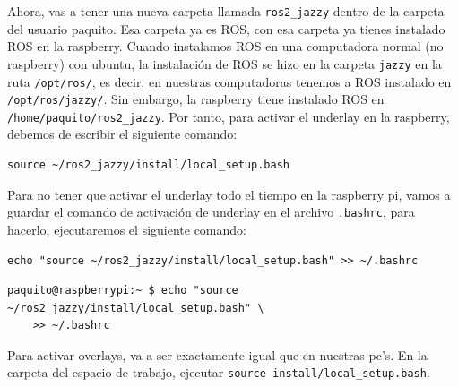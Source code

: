Ahora, vas a tener una nueva carpeta llamada \texttt{ros2\_jazzy} dentro de la carpeta del usuario paquito. Esa carpeta ya es ROS, con esa carpeta ya tienes instalado ROS en la raspberry. Cuando instalamos ROS en una computadora normal (no raspberry) con ubuntu, la instalación de ROS se hizo en la carpeta \texttt{jazzy} en la ruta \texttt{/opt/ros/}, es decir, en nuestras computadoras tenemos a ROS instalado en \texttt{/opt/ros/jazzy/}. Sin embargo, la raspberry tiene instalado ROS en \texttt{/home/paquito/ros2\_jazzy}. Por tanto, para activar el underlay en la raspberry, debemos de escribir el siguiente comando:

\begin{center}
    \begin{Verbatim}[gobble=4]
    source ~/ros2_jazzy/install/local_setup.bash    
    \end{Verbatim}
\end{center}

Para no tener que activar el underlay todo el tiempo en la raspberry pi, vamos a guardar el comando de activación de underlay en el archivo \texttt{.bashrc}, para hacerlo, ejecutaremos el siguiente comando:%

\begin{center}
    \begin{Verbatim}[gobble=4]
    echo "source ~/ros2_jazzy/install/local_setup.bash" >> ~/.bashrc    
    \end{Verbatim}
\end{center}

\begin{center}
    \begin{Verbatim}[gobble=4]
    paquito@raspberrypi:~ $ echo "source ~/ros2_jazzy/install/local_setup.bash" \
    >> ~/.bashrc
    \end{Verbatim}
\end{center}

Para activar overlays, va a ser exactamente igual que en nuestras pc's. En la carpeta del espacio de trabajo, ejecutar \texttt{source install/local\_setup.bash}.